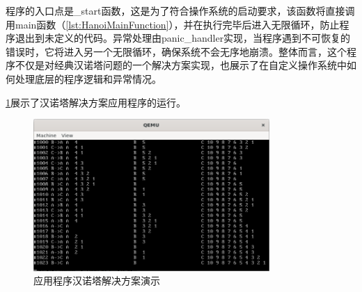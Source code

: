程序的入口点是\_start函数，这是为了符合操作系统的启动要求，该函数将直接调用main函数（\cref{lst:HanoiMainFunction}），并在执行完毕后进入无限循环，防止程序退出到未定义的代码。异常处理由panic\_handler实现，当程序遇到不可恢复的错误时，它将进入另一个无限循环，确保系统不会无序地崩溃。整体而言，这个程序不仅是对经典汉诺塔问题的一个解决方案实现，也展示了在自定义操作系统中如何处理底层的程序逻辑和异常情况。

\cref{fig:ApplicationHanoiPresentation}展示了汉诺塔解决方案应用程序的运行。

\begin{figure}[htbp]
    \centering
    \includegraphics[width=0.8\textwidth]{figures/ApplicationHanoiPresentation.png}
    \caption{应用程序汉诺塔解决方案演示}
    \label{fig:ApplicationHanoiPresentation}
\end{figure}